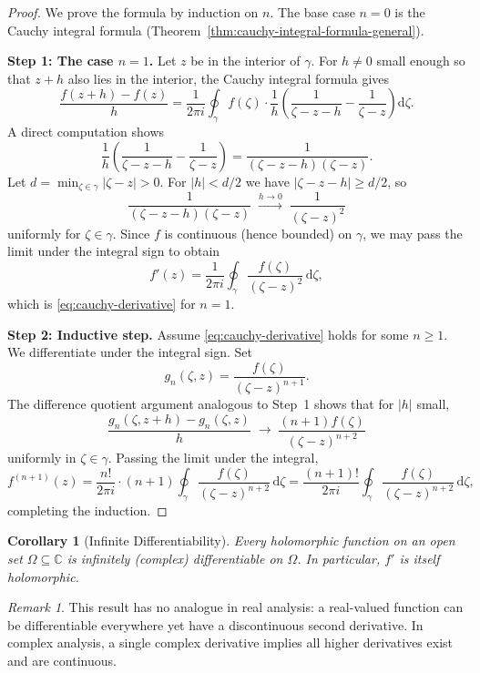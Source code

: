 \documentclass[12pt,a4paper,openany]{book}
\theoremstyle{definition}
\theoremstyle{plain}
\newtheorem{corollary}[definition]{Corollary}
\theoremstyle{remark}
\newtheorem{remark}[definition]{Remark}
\newcommand{\C}{\mathbb{C}}
\newcommand{\dd}{\mathrm{d}}
\newcommand{\abs}[1]{\left|#1\right|}
\begin{document}
\begin{proof}
We prove the formula by induction on $n$. The base case $n=0$ is the Cauchy
integral formula (Theorem~\ref{thm:cauchy-integral-formula-general}).

\medskip\noindent
\textbf{Step 1: The case $n=1$.}
Let $z$ be in the interior of $\gamma$. For $h\ne 0$ small enough so that $z+h$ also
lies in the interior, the Cauchy integral formula gives
\[
  \frac{f(z+h)-f(z)}{h}
  = \frac{1}{2\pi i}\oint_\gamma f(\zeta)
    \cdot\frac{1}{h}\left(\frac{1}{\zeta-z-h}-\frac{1}{\zeta-z}\right)\dd\zeta.
\]
A direct computation shows
\[
  \frac{1}{h}\left(\frac{1}{\zeta-z-h}-\frac{1}{\zeta-z}\right)
  = \frac{1}{(\zeta-z-h)(\zeta-z)}.
\]
Let $d = \min_{\zeta\in\gamma}\abs{\zeta-z}>0$. For $\abs{h}<d/2$ we have
$\abs{\zeta-z-h}\ge d/2$, so
\[
  \frac{1}{(\zeta-z-h)(\zeta-z)} \;\xrightarrow{h\to 0}\;
  \frac{1}{(\zeta-z)^2}
\]
uniformly for $\zeta\in\gamma$. Since $f$ is continuous (hence bounded) on $\gamma$,
we may pass the limit under the integral sign to obtain
\[
  f'(z) = \frac{1}{2\pi i}\oint_\gamma \frac{f(\zeta)}{(\zeta-z)^2}\,\dd\zeta,
\]
which is \eqref{eq:cauchy-derivative} for $n=1$.

\medskip\noindent
\textbf{Step 2: Inductive step.}
Assume \eqref{eq:cauchy-derivative} holds for some $n\ge 1$. We differentiate
under the integral sign. Set
\[
  g_n(\zeta,z) = \frac{f(\zeta)}{(\zeta-z)^{n+1}}.
\]
The difference quotient argument analogous to Step~1 shows that for $\abs{h}$
small,
\[
  \frac{g_n(\zeta,z+h)-g_n(\zeta,z)}{h}
  \;\to\; \frac{(n+1)f(\zeta)}{(\zeta-z)^{n+2}}
\]
uniformly in $\zeta\in\gamma$. Passing the limit under the integral,
\[
  f^{(n+1)}(z) = \frac{n!}{2\pi i}\cdot(n+1)\oint_\gamma
    \frac{f(\zeta)}{(\zeta-z)^{n+2}}\,\dd\zeta
  = \frac{(n+1)!}{2\pi i}\oint_\gamma
    \frac{f(\zeta)}{(\zeta-z)^{n+2}}\,\dd\zeta,
\]
completing the induction.
\end{proof}

\begin{corollary}[Infinite Differentiability]\label{cor:holomorphic-smooth}
Every holomorphic function on an open set $\Omega\subseteq\C$ is infinitely
(complex) differentiable on $\Omega$. In particular, $f'$ is itself holomorphic.
\end{corollary}

\begin{remark}\label{rem:real-vs-complex}
This result has no analogue in real analysis: a real-valued function can be
differentiable everywhere yet have a discontinuous second derivative. In complex
analysis, a single complex derivative implies all higher derivatives exist and are
continuous.
\end{remark}
\end{document}
